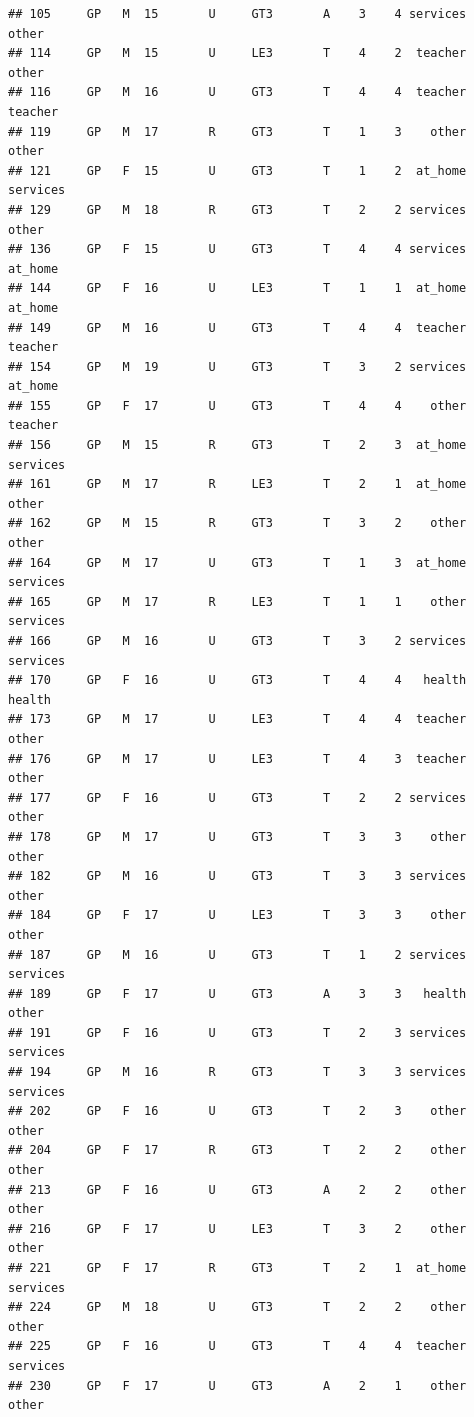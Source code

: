 \documentclass[
]{article}
\begin{document}
\begin{verbatim}
## 105     GP   M  15       U     GT3       A    3    4 services    other
## 114     GP   M  15       U     LE3       T    4    2  teacher    other
## 116     GP   M  16       U     GT3       T    4    4  teacher  teacher
## 119     GP   M  17       R     GT3       T    1    3    other    other
## 121     GP   F  15       U     GT3       T    1    2  at_home services
## 129     GP   M  18       R     GT3       T    2    2 services    other
## 136     GP   F  15       U     GT3       T    4    4 services  at_home
## 144     GP   F  16       U     LE3       T    1    1  at_home  at_home
## 149     GP   M  16       U     GT3       T    4    4  teacher  teacher
## 154     GP   M  19       U     GT3       T    3    2 services  at_home
## 155     GP   F  17       U     GT3       T    4    4    other  teacher
## 156     GP   M  15       R     GT3       T    2    3  at_home services
## 161     GP   M  17       R     LE3       T    2    1  at_home    other
## 162     GP   M  15       R     GT3       T    3    2    other    other
## 164     GP   M  17       U     GT3       T    1    3  at_home services
## 165     GP   M  17       R     LE3       T    1    1    other services
## 166     GP   M  16       U     GT3       T    3    2 services services
## 170     GP   F  16       U     GT3       T    4    4   health   health
## 173     GP   M  17       U     LE3       T    4    4  teacher    other
## 176     GP   M  17       U     LE3       T    4    3  teacher    other
## 177     GP   F  16       U     GT3       T    2    2 services    other
## 178     GP   M  17       U     GT3       T    3    3    other    other
## 182     GP   M  16       U     GT3       T    3    3 services    other
## 184     GP   F  17       U     LE3       T    3    3    other    other
## 187     GP   M  16       U     GT3       T    1    2 services services
## 189     GP   F  17       U     GT3       A    3    3   health    other
## 191     GP   F  16       U     GT3       T    2    3 services services
## 194     GP   M  16       R     GT3       T    3    3 services services
## 202     GP   F  16       U     GT3       T    2    3    other    other
## 204     GP   F  17       R     GT3       T    2    2    other    other
## 213     GP   F  16       U     GT3       A    2    2    other    other
## 216     GP   F  17       U     LE3       T    3    2    other    other
## 221     GP   F  17       R     GT3       T    2    1  at_home services
## 224     GP   M  18       U     GT3       T    2    2    other    other
## 225     GP   F  16       U     GT3       T    4    4  teacher services
## 230     GP   F  17       U     GT3       A    2    1    other    other

\end{verbatim}
\end{document}
